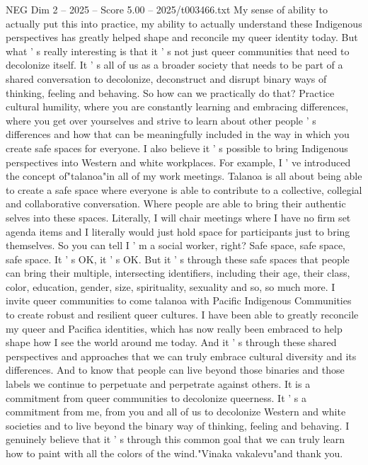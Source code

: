 \begin{textsample}{NEG Dim 2 – 2025 – Score 5.00 – 2025/t003466.txt}
My sense of ability to actually put this into practice, my ability to actually understand these Indigenous perspectives has greatly helped shape and reconcile my queer identity today.
But what ' s really interesting is that it ' s not just queer communities that need to decolonize itself.
It ' s all of us as a broader society that needs to be part of a shared conversation to decolonize, deconstruct and disrupt binary ways of thinking, feeling and behaving.
So how can we practically do that?
Practice cultural humility, where you are constantly learning and embracing differences, where you get over yourselves and strive to learn about other people ' s differences and how that can be meaningfully included in the way in which you create safe spaces for everyone.
I also believe it ' s possible to bring Indigenous perspectives into Western and white workplaces.
For example, I ' ve introduced the concept of"talanoa"in all of my work meetings.
Talanoa is all about being able to create a safe space where everyone is able to contribute to a collective, collegial and collaborative conversation.
Where people are able to bring their authentic selves into these spaces.
Literally, I will chair meetings where I have no firm set agenda items and I literally would just hold space for participants just to bring themselves.
So you can tell I ' m a social worker, right?
Safe space, safe space, safe space.
It ' s OK, it ' s OK.
But it ' s through these safe spaces that people can bring their multiple, intersecting identifiers, including their age, their class, color, education, gender, size, spirituality, sexuality and so, so much more.
I invite queer communities to come talanoa with Pacific Indigenous Communities to create robust and resilient queer cultures.
I have been able to greatly reconcile my queer and Pacifica identities, which has now really been embraced to help shape how I see the world around me today.
And it ' s through these shared perspectives and approaches that we can truly embrace cultural diversity and its differences.
And to know that people can live beyond those binaries and those labels we continue to perpetuate and perpetrate against others.
It is a commitment from queer communities to decolonize queerness.
It ' s a commitment from me, from you and all of us to decolonize Western and white societies and to live beyond the binary way of thinking, feeling and behaving.
I genuinely believe that it ' s through this common goal that we can truly learn how to paint with all the colors of the wind."Vinaka vakalevu"and thank you.

\end{textsample}
